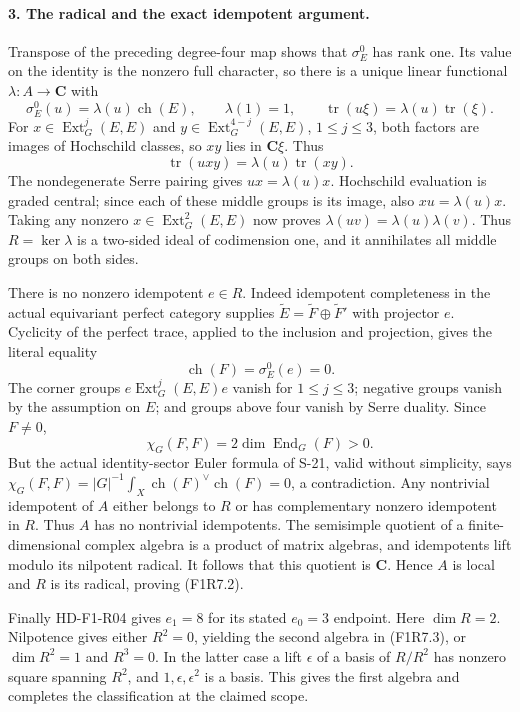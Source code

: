 \paragraph{3. The radical and the exact idempotent argument.}
Transpose of the preceding degree-four map shows that $\sigma_E^0$
has rank one. Its value on the identity is the nonzero full character,
so there is a unique linear functional $\lambda:A\to\mathbf C$ with
\[
 \sigma_E^0(u)=\lambda(u)\operatorname{ch}(E),\qquad
 \lambda(1)=1,\qquad
 \operatorname{tr}(u\xi)=\lambda(u)\operatorname{tr}(\xi).
 \tag{F1R7.8}
\]
For $x\in\operatorname{Ext}^j_G(E,E)$ and
$y\in\operatorname{Ext}^{4-j}_G(E,E)$, $1\le j\le3$, both factors
are images of Hochschild classes, so $xy$ lies in $\mathbf C\xi$.
Thus
\[
 \operatorname{tr}(uxy)=\lambda(u)\operatorname{tr}(xy).
\]
The nondegenerate Serre pairing gives $ux=\lambda(u)x$.
Hochschild evaluation is graded central; since each of these middle
groups is its image, also $xu=\lambda(u)x$.
Taking any nonzero $x\in\operatorname{Ext}^2_G(E,E)$ now proves
$\lambda(uv)=\lambda(u)\lambda(v)$. Thus $R=\ker\lambda$ is a
two-sided ideal of codimension one, and it annihilates all middle
groups on both sides.

There is no nonzero idempotent $e\in R$. Indeed idempotent
completeness in the actual equivariant perfect category supplies
$\widetilde E=\widetilde F\oplus\widetilde F'$ with projector $e$.
Cyclicity of the perfect trace, applied to the inclusion and
projection, gives the literal equality
\[
 \operatorname{ch}(F)=\sigma_E^0(e)=0.
 \tag{F1R7.9}
\]
The corner groups $e\operatorname{Ext}^j_G(E,E)e$ vanish for
$1\le j\le3$; negative groups vanish by the assumption on $E$;
and groups above four vanish by Serre duality. Since $F\ne0$,
\[
 \chi_G(F,F)=2\dim\operatorname{End}_G(F)>0.
 \tag{F1R7.10}
\]
But the actual identity-sector Euler formula of S-21, valid without
simplicity, says
$\chi_G(F,F)=|G|^{-1}\int_X\operatorname{ch}(F)^\vee
\operatorname{ch}(F)=0$, a contradiction. Any nontrivial idempotent
of $A$ either belongs to $R$ or has complementary nonzero idempotent
in $R$. Thus $A$ has no nontrivial idempotents. The semisimple quotient
of a finite-dimensional complex algebra is a product of matrix
algebras, and idempotents lift modulo its nilpotent radical. It follows
that this quotient is $\mathbf C$. Hence $A$ is local and $R$ is
its radical, proving (F1R7.2).

Finally HD-F1-R04 gives $e_1=8$ for its stated $e_0=3$ endpoint.
Here $\dim R=2$. Nilpotence gives either $R^2=0$, yielding the second
algebra in (F1R7.3), or $\dim R^2=1$ and $R^3=0$. In the latter
case a lift $\epsilon$ of a basis of $R/R^2$ has nonzero square
spanning $R^2$, and $1,\epsilon,\epsilon^2$ is a basis. This gives
the first algebra and completes the classification at the claimed
scope.

